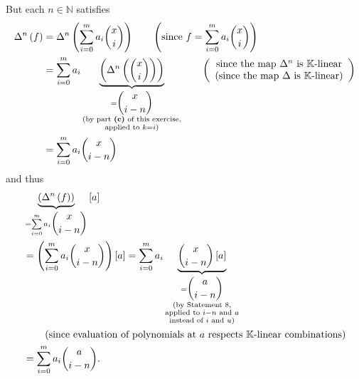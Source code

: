 \documentclass[paper=a4, fontsize=12pt]{scrartcl}%
\let\sumnonlimits\sum
\renewcommand{\sum}{\sumnonlimits\limits}
\theoremstyle{plainsl}
\theoremstyle{definition}
\theoremstyle{remark}
\begin{document}
But each $n\in\mathbb{N}$ satisfies%
\begin{align*}
\Delta^{n}\left(  f\right)   &  =\Delta^{n}\left(  \sum_{i=0}^{m}a_{i}%
\dbinom{x}{i}\right)  \qquad\left(  \text{since }f=\sum_{i=0}^{m}a_{i}%
\dbinom{x}{i}\right)  \\
&  =\sum_{i=0}^{m}a_{i}\underbrace{\left(  \Delta^{n}\left(  \dbinom{x}%
{i}\right)  \right)  }_{\substack{=\dbinom{x}{i-n}\\\text{(by part
\textbf{(c)} of this exercise,}\\\text{applied to }k=i\text{)}}}\qquad\left(
\begin{array}
[c]{c}%
\text{since the map }\Delta^{n}\text{ is }\mathbb{K}\text{-linear}\\
\text{(since the map }\Delta\text{ is }\mathbb{K}\text{-linear)}%
\end{array}
\right)  \\
&  =\sum_{i=0}^{m}a_{i}\dbinom{x}{i-n}%
\end{align*}
and thus%
\begin{align}
&  \underbrace{\left(  \Delta^{n}\left(  f\right)  \right)  }_{=\sum_{i=0}%
^{m}a_{i}\dbinom{x}{i-n}}\left[  a\right]  \nonumber\\
&  =\left(  \sum_{i=0}^{m}a_{i}\dbinom{x}{i-n}\right)  \left[  a\right]
=\sum_{i=0}^{m}a_{i}\underbrace{\dbinom{x}{i-n}\left[  a\right]
}_{\substack{=\dbinom{a}{i-n}\\\text{(by Statement 8,}\\\text{applied to
}i-n\text{ and }a\\\text{instead of }i\text{ and }u\text{)}}}\nonumber\\
&  \qquad\left(  \text{since evaluation of polynomials at }a\text{ respects
}\mathbb{K}\text{-linear combinations}\right)  \nonumber\\
&  =\sum_{i=0}^{m}a_{i}\dbinom{a}{i-n}%
.\label{sol.pol.fin-differences.e.Delnfa}%
\end{align}
\end{document}
